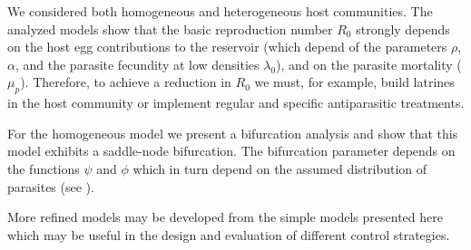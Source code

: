 \documentclass[12pt,a4paper]{article}
\theoremstyle{plain}%
\theoremstyle{definition}
\theoremstyle{remark}
\begin{document}
We considered both homogeneous and heterogeneous host communities. 
The analyzed models show that the basic reproduction number $R_0$ strongly depends 
on the %
host egg contributions to the reservoir (which depend of the parameters $\rho$, $\alpha$, and the parasite fecundity at low densities $\lambda_0 $), and on the parasite mortality ($\mu_p$). 
Therefore, to achieve a reduction in $R_0$ we must, for example, build latrines in the host community or implement regular and specific antiparasitic treatments.


For the homogeneous model we present a bifurcation analysis and show that this model exhibits a saddle-node bifurcation.
The bifurcation parameter depends on the functions $\psi$ and $\phi$ which in turn depend on the assumed
distribution of parasites (see \cite{lopez2022general}).

More refined models may be developed from the simple models presented here which may be useful in the design and evaluation of different control strategies. 


\end{document}
